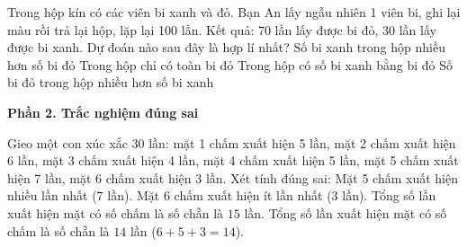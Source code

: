 \begin{ex} %
Trong hộp kín có các viên bi xanh và đỏ. Bạn An lấy ngẫu nhiên 1 viên bi, ghi lại màu rồi trả lại hộp, lặp lại 100 lần. Kết quả: 70 lần lấy được bi đỏ, 30 lần lấy được bi xanh. Dự đoán nào sau đây là hợp lí nhất?
\choice
{Số bi xanh trong hộp nhiều hơn số bi đỏ}
{Trong hộp chỉ có toàn bi đỏ}
{Trong hộp có số bi xanh bằng bi đỏ}
{\True Số bi đỏ trong hộp nhiều hơn số bi xanh}
\end{ex}

\textbf{Phần 2. Trắc nghiệm đúng sai}

\begin{ex} %
Gieo một con xúc xắc 30 lần: mặt 1 chấm xuất hiện 5 lần, mặt 2 chấm xuất hiện 6 lần, mặt 3 chấm xuất hiện 4 lần, mặt 4 chấm xuất hiện 5 lần, mặt 5 chấm xuất hiện 7 lần, mặt 6 chấm xuất hiện 3 lần. Xét tính đúng sai:
\choiceTF
{\True Mặt 5 chấm xuất hiện nhiều lần nhất ($7$ lần).}
{\True Mặt 6 chấm xuất hiện ít lần nhất ($3$ lần).}
{Tổng số lần xuất hiện mặt có số chấm là số chẵn là $15$ lần.}
{\True Tổng số lần xuất hiện mặt có số chấm là số chẵn là $14$ lần ($6 + 5 + 3 = 14$).}
\end{ex}

